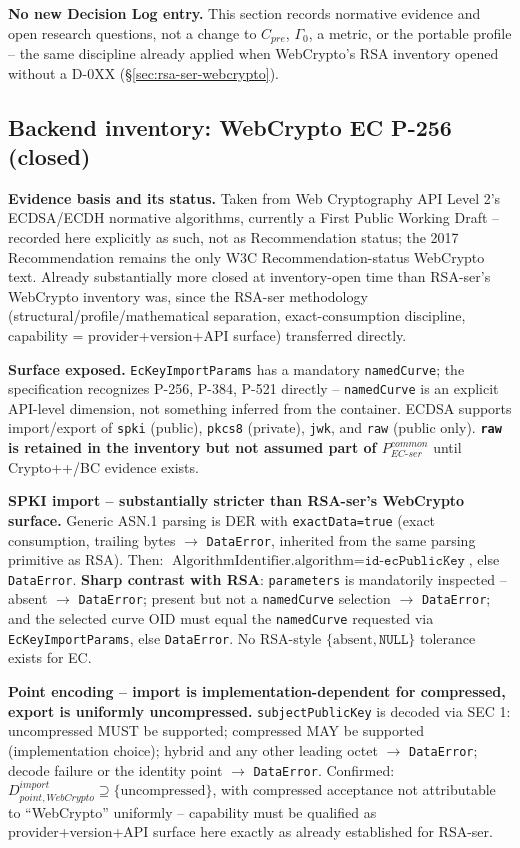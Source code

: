 \documentclass[11pt,a4paper]{article}
\begin{document}
\textbf{No new Decision Log entry.} This section records normative evidence and open research questions, not a change to $C_{pre}$, $\Gamma_0$, a metric, or the portable profile -- the same discipline already applied when WebCrypto's RSA inventory opened without a D-0XX (\S\ref{sec:rsa-ser-webcrypto}).

\subsection{Backend inventory: WebCrypto EC P-256 (closed)}\label{sec:ec-ser-webcrypto}

\textbf{Evidence basis and its status.} Taken from Web Cryptography API Level 2's ECDSA/ECDH normative algorithms, currently a First Public Working Draft -- recorded here explicitly as such, not as Recommendation status; the 2017 Recommendation remains the only W3C Recommendation-status WebCrypto text. Already substantially more closed at inventory-open time than RSA-ser's WebCrypto inventory was, since the RSA-ser methodology (structural/profile/mathematical separation, exact-consumption discipline, capability = provider+version+API surface) transferred directly.

\textbf{Surface exposed.} \texttt{EcKeyImportParams} has a mandatory \texttt{namedCurve}; the specification recognizes P-256, P-384, P-521 directly -- \texttt{namedCurve} is an explicit API-level dimension, not something inferred from the container. ECDSA supports import/export of \texttt{spki} (public), \texttt{pkcs8} (private), \texttt{jwk}, and \texttt{raw} (public only). \textbf{\texttt{raw} is retained in the inventory but not assumed part of $P_{EC\text{-}ser}^{common}$} until Crypto++/BC evidence exists.

\textbf{SPKI import -- substantially stricter than RSA-ser's WebCrypto surface.} Generic ASN.1 parsing is DER with \texttt{exactData=true} (exact consumption, trailing bytes $\to$ \texttt{DataError}, inherited from the same parsing primitive as RSA). Then: $\text{AlgorithmIdentifier.algorithm}=\texttt{id-ecPublicKey}$, else \texttt{DataError}. \textbf{Sharp contrast with RSA}: \texttt{parameters} is mandatorily inspected -- absent $\to$ \texttt{DataError}; present but not a \texttt{namedCurve} selection $\to$ \texttt{DataError}; and the selected curve OID must equal the \texttt{namedCurve} requested via \texttt{EcKeyImportParams}, else \texttt{DataError}. No RSA-style $\{\text{absent},\texttt{NULL}\}$ tolerance exists for EC.

\textbf{Point encoding -- import is implementation-dependent for compressed, export is uniformly uncompressed.} \texttt{subjectPublicKey} is decoded via SEC 1: uncompressed MUST be supported; compressed MAY be supported (implementation choice); hybrid and any other leading octet $\to$ \texttt{DataError}; decode failure or the identity point $\to$ \texttt{DataError}. Confirmed: $D_{point,WebCrypto}^{import}\supseteq\{\text{uncompressed}\}$, with compressed acceptance not attributable to ``WebCrypto'' uniformly -- capability must be qualified as provider+version+API surface here exactly as already established for RSA-ser.
\end{document}
